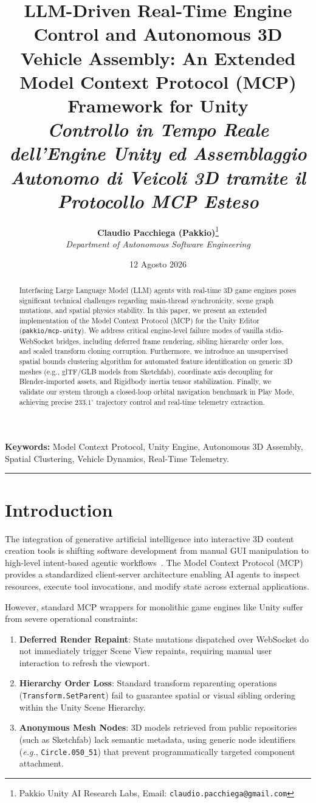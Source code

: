 \documentclass[11pt,a4paper]{article}
\title{\LARGE \textbf{LLM-Driven Real-Time Engine Control and Autonomous 3D Vehicle Assembly: An Extended Model Context Protocol (MCP) Framework for Unity}\\[0.5em]
\large \textit{Controllo in Tempo Reale dell'Engine Unity ed Assemblaggio Autonomo di Veicoli 3D tramite il Protocollo MCP Esteso}}
\author{
  \textbf{Claudio Pacchiega (Pakkio)}\thanks{Pakkio Unity AI Research Labs, Email: \texttt{claudio.pacchiega@gmail.com}}\\
  \textit{Department of Autonomous Software Engineering}
}
\date{12 Agosto 2026}
\begin{document}
\maketitle

\begin{abstract}
Interfacing Large Language Model (LLM) agents with real-time 3D game engines poses significant technical challenges regarding main-thread synchronicity, scene graph mutations, and spatial physics stability. In this paper, we present an extended implementation of the Model Context Protocol (MCP) for the Unity Editor (\texttt{pakkio/mcp-unity}). We address critical engine-level failure modes of vanilla stdio-WebSocket bridges, including deferred frame rendering, sibling hierarchy order loss, and scaled transform cloning corruption. Furthermore, we introduce an unsupervised spatial bounds clustering algorithm for automated feature identification on generic 3D meshes (e.g., glTF/GLB models from Sketchfab), coordinate axis decoupling for Blender-imported assets, and Rigidbody inertia tensor stabilization. Finally, we validate our system through a closed-loop orbital navigation benchmark in Play Mode, achieving precise $233.1^\circ$ trajectory control and real-time telemetry extraction.
\end{abstract}

\textbf{\small Keywords:} Model Context Protocol, Unity Engine, Autonomous 3D Assembly, Spatial Clustering, Vehicle Dynamics, Real-Time Telemetry.

\hrule
\vspace{1em}

\section{Introduction}
The integration of generative artificial intelligence into interactive 3D content creation tools is shifting software development from manual GUI manipulation to high-level intent-based agentic workflows~\cite{anthropic2024mcp}. The Model Context Protocol (MCP) provides a standardized client-server architecture enabling AI agents to inspect resources, execute tool invocations, and modify state across external applications.

However, standard MCP wrappers for monolithic game engines like Unity suffer from severe operational constraints:
\begin{enumerate}
    \item \textbf{Deferred Render Repaint}: State mutations dispatched over WebSocket do not immediately trigger Scene View repaints, requiring manual user interaction to refresh the viewport.
    \item \textbf{Hierarchy Order Loss}: Standard transform reparenting operations (\texttt{Transform.SetParent}) fail to guarantee spatial or visual sibling ordering within the Unity Scene Hierarchy.
    \item \textbf{Anonymous Mesh Nodes}: 3D models retrieved from public repositories (such as Sketchfab) lack semantic metadata, using generic node identifiers (\textit{e.g.}, \texttt{Circle.050\_51}) that prevent programmatically targeted component attachment.
\end{enumerate}
\end{document}
